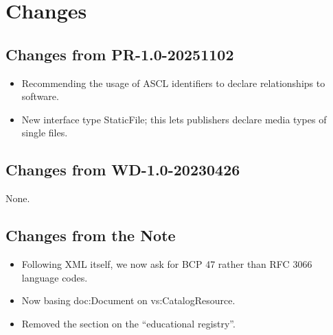 \documentclass{ivoa}
\begin{document}
\section{Changes}

\subsection{Changes from PR-1.0-20251102}

\begin{itemize}
\item Recommending the usage of ASCL identifiers to declare
relationships to software.
\item New interface type StaticFile; this lets publishers declare
media types of single files.
\end{itemize}

\subsection{Changes from WD-1.0-20230426}

None.

\subsection{Changes from the Note}

\begin{itemize}
\item Following XML itself, we now ask for BCP 47 rather than RFC
3066 language codes.
\item Now basing doc:Document on vs:CatalogResource.
\item Removed the section on the ``educational registry''.
\end{itemize}


\end{document}
